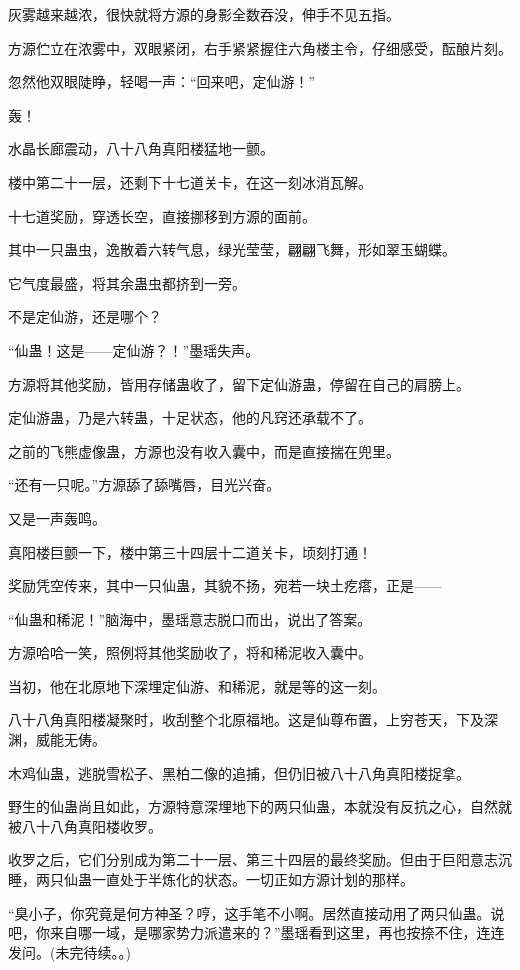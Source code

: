 \begin{this_body}
灰雾越来越浓，很快就将方源的身影全数吞没，伸手不见五指。

方源伫立在浓雾中，双眼紧闭，右手紧紧握住六角楼主令，仔细感受，酝酿片刻。

忽然他双眼陡睁，轻喝一声：“回来吧，定仙游！”

轰！

水晶长廊震动，八十八角真阳楼猛地一颤。

楼中第二十一层，还剩下十七道关卡，在这一刻冰消瓦解。

十七道奖励，穿透长空，直接挪移到方源的面前。

其中一只蛊虫，逸散着六转气息，绿光莹莹，翩翩飞舞，形如翠玉蝴蝶。

它气度最盛，将其余蛊虫都挤到一旁。

不是定仙游，还是哪个？

“仙蛊！这是——定仙游？！”墨瑶失声。

方源将其他奖励，皆用存储蛊收了，留下定仙游蛊，停留在自己的肩膀上。

定仙游蛊，乃是六转蛊，十足状态，他的凡窍还承载不了。

之前的飞熊虚像蛊，方源也没有收入囊中，而是直接揣在兜里。

“还有一只呢。”方源舔了舔嘴唇，目光兴奋。

又是一声轰鸣。

真阳楼巨颤一下，楼中第三十四层十二道关卡，顷刻打通！

奖励凭空传来，其中一只仙蛊，其貌不扬，宛若一块土疙瘩，正是——

“仙蛊和稀泥！”脑海中，墨瑶意志脱口而出，说出了答案。

方源哈哈一笑，照例将其他奖励收了，将和稀泥收入囊中。

当初，他在北原地下深埋定仙游、和稀泥，就是等的这一刻。

八十八角真阳楼凝聚时，收刮整个北原福地。这是仙尊布置，上穷苍天，下及深渊，威能无俦。

木鸡仙蛊，逃脱雪松子、黑柏二像的追捕，但仍旧被八十八角真阳楼捉拿。

野生的仙蛊尚且如此，方源特意深埋地下的两只仙蛊，本就没有反抗之心，自然就被八十八角真阳楼收罗。

收罗之后，它们分别成为第二十一层、第三十四层的最终奖励。但由于巨阳意志沉睡，两只仙蛊一直处于半炼化的状态。一切正如方源计划的那样。

“臭小子，你究竟是何方神圣？哼，这手笔不小啊。居然直接动用了两只仙蛊。说吧，你来自哪一域，是哪家势力派遣来的？”墨瑶看到这里，再也按捺不住，连连发问。(未完待续。。)

\end{this_body}


